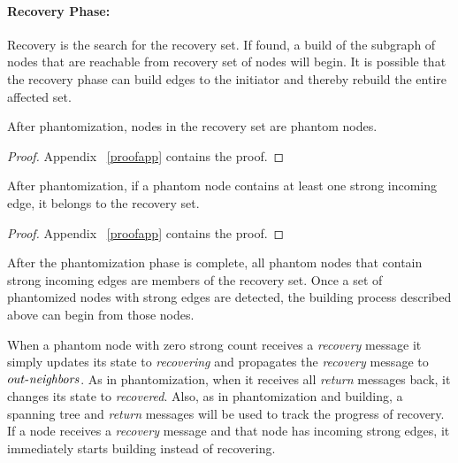 \paragraph{Recovery Phase:}
Recovery is the search for the recovery set. If found, a build of the subgraph of
nodes that are reachable from recovery set of nodes will begin. It is possible that the
recovery phase can build edges to the initiator and thereby rebuild the entire
affected set.


\begin{lemma}[Phantomized]
After phantomization, nodes in the recovery set are phantom nodes.
\label{lem:phant}
\end{lemma}
\begin{proof}
Appendix ~\ref{proofapp} contains the proof.
\end{proof}

\begin{lemma}
After phantomization,
if a phantom node contains at least one strong incoming edge,
it belongs to the recovery set.
\label{lema:recoveryset}
\end{lemma}
\begin{proof}
Appendix ~\ref{proofapp} contains the proof.
\end{proof}

After the phantomization phase is complete, all phantom nodes that contain strong
incoming edges are members of the recovery set.  Once a set of phantomized nodes
with strong edges are detected, the building process described above can begin
from those nodes.

When a phantom node with zero strong count %
receives a \emph{recovery}
message
it simply updates its state to \emph{recovering} and
propagates the \emph{recovery} message to $\mathop{\mbox{$out$-$\mathit{neighbors}$}}$. As in phantomization, when it receives all
\emph{return} messages back, it changes its state to \emph{recovered}. Also, as in phantomization
and building, a spanning tree and \emph{return} messages will be used to track
the progress of recovery.
If a node receives a \emph{recovery} message and that node has incoming
strong edges, it immediately starts building instead of recovering.

